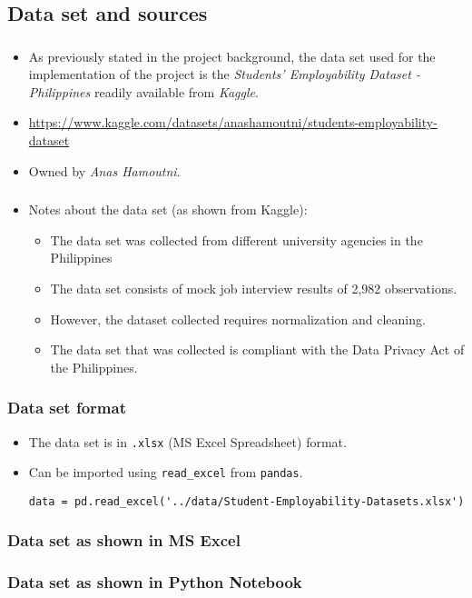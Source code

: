 \subsection{Data set and sources}
\begin{frame}
\frametitle{\subsecname}
	\begin{itemize}
		\item As previously stated in the project background, the data set used for the implementation of the project is the \textit{Students' Employability Dataset - Philippines} readily available from \textit{Kaggle}.
		\item \url{https://www.kaggle.com/datasets/anashamoutni/students-employability-dataset}
		\item Owned by \textit{Anas Hamoutni}.
	\end{itemize}
\end{frame}

\begin{frame}
\frametitle{\subsecname}
	\begin{itemize}
		\item Notes about the data set (as shown from Kaggle):
		\begin{itemize}
			\item The data set was collected from different university agencies in the Philippines
			\item The data set consists of mock job interview results of 2,982 observations.
			\item However, the dataset collected requires normalization and cleaning.
			\item The data set that was collected is compliant with the Data Privacy Act of the Philippines.
		\end{itemize}
	\end{itemize}
\end{frame}

\begin{frame}[fragile]
\frametitle{Data set format}
	\begin{itemize}
		\item The data set is in \texttt{.xlsx} (MS Excel Spreadsheet) format.
		\item Can be imported using \texttt{read\_excel} from \texttt{pandas}.
\begin{verbatim}
data = pd.read_excel('../data/Student-Employability-Datasets.xlsx')
\end{verbatim}
	\end{itemize}
\end{frame}

\begin{frame}
\frametitle{Data set as shown in MS Excel}
\end{frame}

\begin{frame}
\frametitle{Data set as shown in Python Notebook}
\end{frame}
